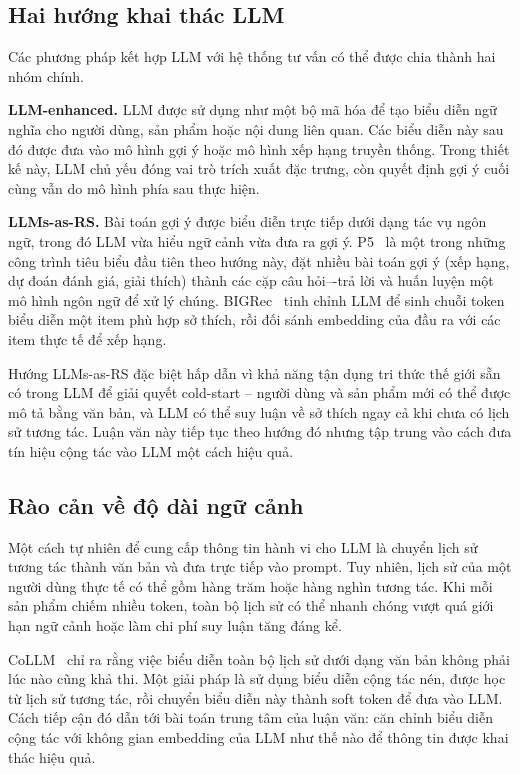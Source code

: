 \subsection{Hai hướng khai thác LLM}
\label{ssec:hai-huong}

Các phương pháp kết hợp LLM với hệ thống tư vấn có thể được chia thành hai nhóm chính.

\textbf{LLM-enhanced.} LLM được sử dụng như một bộ mã hóa để tạo biểu diễn ngữ nghĩa cho
người dùng, sản phẩm hoặc nội dung liên quan. Các biểu diễn này sau đó được đưa vào mô
hình gợi ý hoặc mô hình xếp hạng truyền thống. Trong thiết kế này, LLM chủ yếu đóng vai trò
trích xuất đặc trưng, còn quyết định gợi ý cuối cùng vẫn do mô hình phía sau thực hiện.

\textbf{LLMs-as-RS.} Bài toán gợi ý được biểu diễn trực tiếp dưới dạng tác vụ ngôn ngữ,
trong đó LLM vừa hiểu ngữ cảnh vừa đưa ra gợi ý. P5~\cite{p52022} là một trong những
công trình tiêu biểu đầu tiên theo hướng này, đặt nhiều bài toán gợi ý
(xếp hạng, dự đoán đánh giá, giải thích) thành các cặp câu hỏi–-trả lời
và huấn luyện một mô hình ngôn ngữ để xử lý chúng. BIGRec~\cite{bigrec2023}
tinh chỉnh LLM để sinh chuỗi token biểu diễn một item phù hợp sở thích,
rồi đối sánh embedding của đầu ra với các item thực tế để xếp hạng.

Hướng LLMs-as-RS đặc biệt hấp dẫn vì khả năng tận dụng tri thức thế giới sẵn có trong
LLM để giải quyết cold-start -- người dùng và sản phẩm mới có thể được mô tả bằng văn
bản, và LLM có thể suy luận về sở thích ngay cả khi chưa có lịch sử tương tác.
Luận văn này tiếp tục theo hướng đó nhưng tập trung vào cách đưa tín hiệu cộng tác vào LLM một cách hiệu quả.

\subsection{Rào cản về độ dài ngữ cảnh}
\label{ssec:rao-can-context}

Một cách tự nhiên để cung cấp thông tin hành vi cho LLM là chuyển lịch sử tương tác thành
văn bản và đưa trực tiếp vào prompt. Tuy nhiên, lịch sử của một người dùng thực tế có thể gồm
hàng trăm hoặc hàng nghìn tương tác. Khi mỗi sản phẩm chiếm nhiều token, toàn bộ lịch sử
có thể nhanh chóng vượt quá giới hạn ngữ cảnh hoặc làm chi phí suy luận tăng đáng kể.

CoLLM~\cite{collm2023} chỉ ra rằng việc biểu diễn toàn bộ lịch sử dưới dạng văn bản không
phải lúc nào cũng khả thi. Một giải pháp là sử dụng biểu diễn cộng tác nén, được học từ lịch
sử tương tác, rồi chuyển biểu diễn này thành soft token để đưa vào LLM. Cách tiếp cận đó dẫn
tới bài toán trung tâm của luận văn: căn chỉnh biểu diễn cộng tác với không gian embedding
của LLM như thế nào để thông tin được khai thác hiệu quả.


